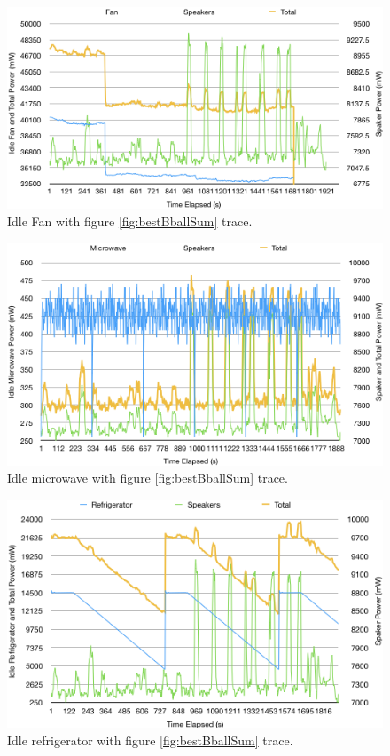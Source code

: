 \begin{figure}[H]
  \centering
  \includegraphics[width=1\textwidth]{figures/fanIdle.png}
  \caption{Idle Fan with figure \ref{fig:bestBballSum} trace.}
  \label{fig:fanIdle}
\end{figure}

\begin{figure}[H]
  \centering
  \includegraphics[width=1\textwidth]{figures/uWaveIdle.png}
  \caption{Idle microwave with figure \ref{fig:bestBballSum} trace.}
  \label{fig:uWaveIdle}
\end{figure}

\begin{figure}[H]
  \centering
  \includegraphics[width=1\textwidth]{figures/fridgeIdle.png}
  \caption{Idle refrigerator with figure \ref{fig:bestBballSum} trace.}
  \label{fig:fridgeIdle}
\end{figure}

